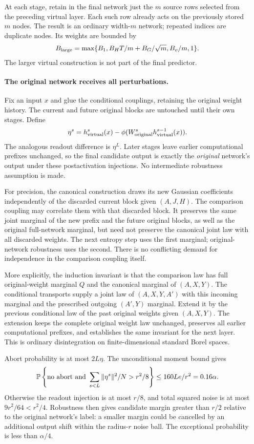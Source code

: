 At each stage, retain in the final network just the $m$ source rows selected
from the preceding virtual layer. Each such row already acts on the previously
stored $m$ nodes. The result is an ordinary width-$m$ network; repeated indices
are duplicate nodes. Its weights are bounded by
\[
 B_{\rm large}=\max\{B_1,B_HT/m+B_G/\sqrt m,B_v/m,1\}.
\]
The larger virtual construction is not part of the final predictor.

\paragraph{The original network receives all perturbations.}
Fix an input $x$ and glue the conditional couplings, retaining the original
weight history. The current and future original blocks are untouched until
their own stages. Define
\[
 \eta^s=h^s_{\rm virtual}(x)
           -\phi(W^s_{\rm original}h^{s-1}_{\rm virtual}(x)).
\]
The analogous readout difference is $\eta^L$. Later stages leave earlier
computational prefixes unchanged, so the final candidate output is exactly
the \emph{original} network's output under these postactivation injections.
No intermediate robustness assumption is made.

For precision, the canonical construction draws its new Gaussian coefficients
independently of the discarded current block given $(A,J,H)$. The comparison
coupling may correlate them with that discarded block. It preserves the same
joint marginal of the new prefix and the future original blocks, as well as
the original full-network marginal, but need not preserve the canonical joint
law with all discarded weights. The next entropy step uses the first marginal;
original-network robustness uses the second. There is no conflicting demand
for independence in the comparison coupling itself.

More explicitly, the induction invariant is that the comparison law has
full original-weight marginal $Q$ and the canonical marginal of
$(A,X,Y)$. The conditional transports supply a joint law of
$(A,X,Y,A')$ with this incoming marginal and the prescribed outgoing
$(A',Y)$ marginal. Extend it by the previous conditional law of the past
original weights given $(A,X,Y)$. The extension keeps the complete original
weight law unchanged, preserves all earlier computational prefixes, and
establishes the same invariant for the next layer. This is ordinary
disintegration on finite-dimensional standard Borel spaces.

Abort probability is at most $2L\eta$. The unconditional moment bound gives
\[
 \mathbb P\left\{\text{no abort and }\sum_{s<L}\|\eta^s\|^2/N>r^2/8\right\}
 \le160Le/r^2=0.16\alpha.
\]
Otherwise the readout injection is at most $r/8$, and total squared noise is
at most $9r^2/64<r^2/4$. Robustness then gives candidate margin greater than
$r/2$ relative to the original network's label: a smaller margin could be
cancelled by an additional output shift within the radius-$r$ noise ball.
The exceptional probability is less than $\alpha/4$.

